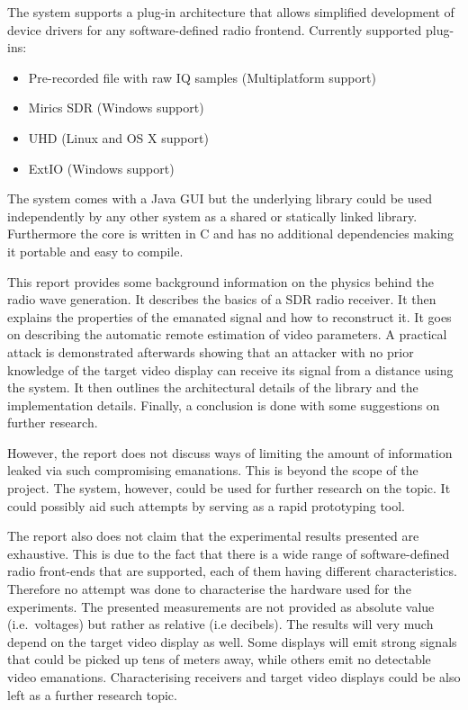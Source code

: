\documentclass[a4paper,12pt,twoside,openright]{report}
\begin{document}
The system supports a plug-in architecture that allows simplified development of device drivers for any software-defined radio frontend. Currently supported plug-ins:

\begin{itemize}

  \item Pre-recorded file with raw IQ samples (Multiplatform support)
  \item Mirics SDR (Windows support)
  \item UHD (Linux and OS X support)
  \item ExtIO (Windows support)

\end{itemize}

The system comes with a Java GUI but the underlying library could be used independently by any other system as a shared or statically linked library. Furthermore the core is written in C and has no additional dependencies making it portable and easy to compile.

This report provides some background information on the physics behind the radio wave generation. It describes the basics of a SDR radio receiver. It then explains the properties of the emanated signal and how to reconstruct it. It goes on describing the automatic remote estimation of video parameters. A practical attack is demonstrated afterwards showing that an attacker with no prior knowledge of the target video display can receive its signal from a distance using the system. It then outlines the architectural details of the library and the implementation details. Finally, a conclusion is done with some suggestions on further research.

However, the report does not discuss ways of limiting the amount of information leaked via such compromising emanations. This is beyond the scope of the project. The system, however, could be used for further research on the topic. It could possibly aid such attempts by serving as a rapid prototyping tool.

The report also does not claim that the experimental results presented are exhaustive. This is due to the fact that there is a wide range of software-defined radio front-ends that are supported, each of them having different characteristics. Therefore no attempt was done to characterise the hardware used for the experiments. The presented measurements are not provided as absolute value (i.e.\  voltages) but rather as relative (i.e decibels). The results will very much depend on the target video display as well. Some displays will emit strong signals that could be picked up tens of meters away, while others emit no detectable video emanations. Characterising receivers and target video displays could be also left as a further research topic.
\end{document}
